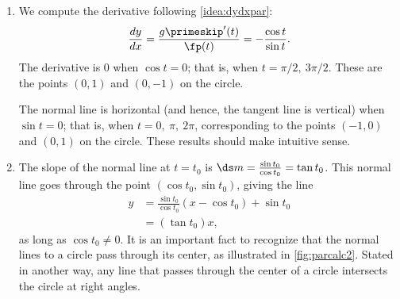 {\begin{enumerate}
	\item We compute the derivative following \autoref{idea:dydxpar}:
	\[\frac{dy}{dx} = \frac{g\primeskip'(t)}{\fp(t)} = -\frac{\cos t}{\sin t}.\]
	The derivative is $0$ when $\cos t= 0$; that is, when $t=\pi/2,\ 3\pi/2$. These are the points $(0,1)$ and $(0,-1)$ on the circle.

	The normal line is horizontal (and hence, the tangent line is vertical) when $\sin t=0$; that is, when $t= 0,\ \pi,\ 2\pi$, corresponding to the points $(-1,0)$ and $(0,1)$ on the circle. These results should make intuitive sense.
	\item	The slope of the normal line at $t=t_0$ is $\ds m=\frac{\sin t_0}{\cos t_0} = \tan t_0$. This normal line goes through the point $(\cos t_0,\sin t_0)$, giving the line
\begin{align*}
	y &=\frac{\sin t_0}{\cos t_0}(x-\cos t_0) + \sin t_0\\	
	&= (\tan t_0)x,
\end{align*}%
%
%
%
as long as $\cos t_0\neq 0$. It is an important fact to recognize that the normal lines to a circle pass through its center, as illustrated in \autoref{fig:parcalc2}. Stated in another way, any line that passes through the center of a circle intersects the circle at right angles.\eoehere
\end{enumerate}}

